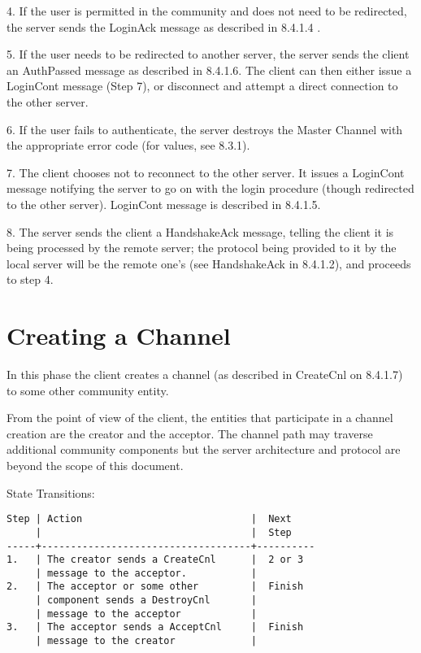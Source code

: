\documentclass[titlepage,oneside]{book}
\begin{document}
\par{} 4. If the user is permitted in the community and does not need
to be redirected, the server sends the LoginAck message as described
in 8.4.1.4 .

\par{} 5. If the user needs to be redirected to another server, the
server sends the client an AuthPassed message as described in 8.4.1.6.
The client can then either issue a LoginCont message (Step 7), or
disconnect and attempt a direct connection to the other server.

\par{} 6. If the user fails to authenticate, the server destroys the
Master Channel with the appropriate error code (for values, see
8.3.1).

\par{} 7. The client chooses not to reconnect to the other server. It
issues a LoginCont message notifying the server to go on with the
login procedure (though redirected to the other server). LoginCont
message is described in 8.4.1.5.

\par{} 8. The server sends the client a HandshakeAck message, telling
the client it is being processed by the remote server; the protocol
being provided to it by the local server will be the remote one's (see
HandshakeAck in 8.4.1.2), and proceeds to step 4.

\section{Creating a Channel}

\par{} In this phase the client creates a channel (as described in
CreateCnl on 8.4.1.7) to some other community entity.

\par{} From the point of view of the client, the entities that
participate in a channel creation are the creator and the
acceptor. The channel path may traverse additional community
components but the server architecture and protocol are beyond the
scope of this document.

\par{} State Transitions:

\begin{verbatim}
Step | Action                             |  Next
     |                                    |  Step
-----+------------------------------------+----------
1.   | The creator sends a CreateCnl      |  2 or 3
     | message to the acceptor.           |
2.   | The acceptor or some other         |  Finish
     | component sends a DestroyCnl       |
     | message to the acceptor            |
3.   | The acceptor sends a AcceptCnl     |  Finish
     | message to the creator             |
\end{verbatim}
\end{document}
